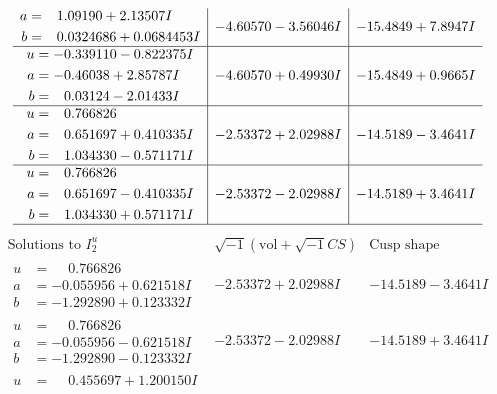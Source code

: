 \documentclass[1p]{elsarticle_modified}
\theoremstyle{definition}
\newcommand{\I}{\sqrt{-1}}
\begin{document}
$$\begin{array}{c|c|c}
\begin{aligned}
a &= \phantom{-}1.09190 + 2.13507 I \\
b &= \phantom{-}0.0324686 + 0.0684453 I\end{aligned}
 & -4.60570 - 3.56046 I & -15.4849 + 7.8947 I \\ \hline\begin{aligned}
u &= -0.339110 - 0.822375 I \\
a &= -0.46038 + 2.85787 I \\
b &= \phantom{-}0.03124 - 2.01433 I\end{aligned}
 & -4.60570 + 0.49930 I & -15.4849 + 0.9665 I \\ \hline\begin{aligned}
u &= \phantom{-}0.766826\phantom{ +0.000000I} \\
a &= \phantom{-}0.651697 + 0.410335 I \\
b &= \phantom{-}1.034330 - 0.571171 I\end{aligned}
 & -2.53372 + 2.02988 I & -14.5189 - 3.4641 I \\ \hline\begin{aligned}
u &= \phantom{-}0.766826\phantom{ +0.000000I} \\
a &= \phantom{-}0.651697 - 0.410335 I \\
b &= \phantom{-}1.034330 + 0.571171 I\end{aligned}
 & -2.53372 - 2.02988 I & -14.5189 + 3.4641 I\\
 \hline 
 \end{array}$$\newpage$$\begin{array}{c|c|c}  
\text{Solutions to }I^u_{2}& \I (\text{vol} + \sqrt{-1}CS) & \text{Cusp shape}\\
 \hline 
\begin{aligned}
u &= \phantom{-}0.766826\phantom{ +0.000000I} \\
a &= -0.055956 + 0.621518 I \\
b &= -1.292890 + 0.123332 I\end{aligned}
 & -2.53372 + 2.02988 I & -14.5189 - 3.4641 I \\ \hline\begin{aligned}
u &= \phantom{-}0.766826\phantom{ +0.000000I} \\
a &= -0.055956 - 0.621518 I \\
b &= -1.292890 - 0.123332 I\end{aligned}
 & -2.53372 - 2.02988 I & -14.5189 + 3.4641 I \\ \hline\begin{aligned}
u &= \phantom{-}0.455697 + 1.200150 I \\

\end{aligned}
\end{array}$$
\end{document}
